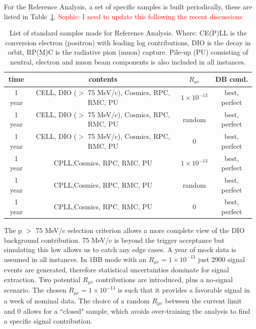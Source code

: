 For the Reference Analysis, a set of specific samples is built periodically, these are listed in Table~\ref{table:refana}.
\textcolor{red}{Sophie: I need to update this following the recent discussions}
\begin{table}[!ht]
\centering
\caption{List of standard samples made for Reference Analysis. Where: CE(P)LL is the conversion electron (positron) with leading log contributions, DIO is the decay in orbit, RP(M)C is the radiative pion (muon) capture. Pile-up (PU) consisting of neutral, electron and muon beam components is also included in all instances.}
\begin{tabular}{c   c   c c} 
time & contents  &$R_{\mu e}$ & DB cond.\\
\hline\hline
1 year & CELL, DIO ($>$ 75 MeV/c), Cosmics, RPC, RMC, PU & $1 \times 10^{-13}$ &  best, perfect \\
1 year  & CELL, DIO ($>$ 75 MeV/c), Cosmics, RPC, RMC, PU  &random & best, perfect \\
1 year  & CELL, DIO ($>$ 75 MeV/c), Cosmics, RPC, RMC, PU  & 0  &  best, perfect \\
\hline
1 year  & CPLL,Cosmics, RPC, RMC, PU  & $1 \times 10^{-13}$ &  best, perfect \\
1 year  & CPLL,Cosmics, RPC, RMC, PU  &random & best, perfect \\
1 year  & CPLL,Cosmics, RPC, RMC, PU  &0 & best, perfect \\
\hline
   \hline
\end{tabular}
\label{table:refana}
\end{table}

The p $>$ 75 MeV/c selection criterion allows a more complete view of the DIO background contribution. 75 MeV/c is beyond the trigger acceptance but simulating this low allows us to catch any edge cases. A year of mock data is assumed in all instances. In 1BB mode with an $R_{\mu e} = 1 \times 10^{-13}$ just 2900 signal events are generated, therefore statistical uncertainties dominate for signal extraction. Two potential $R_{\mu e}$ contributions are introduced, plus a no-signal scenario. The chosen $R_{\mu e} = 1 \times 10^{-13}$ is such that it provides a favorable signal in a week of nominal data.  The choice of a random $R_{\mu e}$ between the current limit and 0 allows for a ``closed" sample, which avoids over-training the analysis to find a specific signal contribution.


